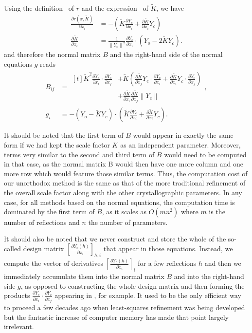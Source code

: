 \documentclass[pdf]{iucr}
\newcommand{\norm}[1]{\left\| #1 \right\|}
\DeclareMathOperator{\dotprod}{\cdot}
\newcommand{\partialder}[2]{\frac{\partial #1}{\partial #2}}
\begin{document}
Using the definition~ of $r$ and the expression~ of $\tilde{K}$, we have
\begin{align}
\partialder{r(x, \tilde{K})}{x_i} &= -\left( \tilde{K}\partialder{Y_c}{x_i} + \partialder{\tilde{K}}{x_i} Y_c \right) \\
\partialder{\tilde{K}}{x_i} &= \frac{1}{\norm{Y_c}^2}\partialder{Y_c}{x_i} \dotprod \left(Y_o - 2 \tilde{K}Y_c \right).
\end{align}
and therefore the normal matrix $B$ and the right-hand side of the normal equations $g$ reads
\begin{align}
B_{ij} &= \begin{aligned}[t] \tilde{K}^2\partialder{Y_c}{x_i} \dotprod \partialder{Y_c}{x_j} 
&+ \tilde{K} \left( \partialder{\tilde{K}}{x_j}Y_c \dotprod \partialder{Y_c}{x_i}
+ \partialder{\tilde{K}}{x_i}Y_c \dotprod \partialder{Y_c}{x_j} \right) \nonumber\\
&+ \partialder{\tilde{K}}{x_i}\partialder{\tilde{K}}{x_j} \norm{Y_c}
\end{aligned},
\label{eqn:normalmatrixwithoutscalefactor} \\
g_i &= - (Y_o - \tilde{K}Y_c) \dotprod \left( \tilde{K}\partialder{Y_c}{x_i} + \partialder{\tilde{K}}{x_i} Y_c \right).
\end{align}

It should be noted that the first term of $B$ would appear in exactly the same form if we had kept the scale factor $K$ as an independent parameter. Moreover, terms very similar to the second and third term of $B$ would need to be computed in that case, as the normal matrix B would then have one more column and one more row which would feature those similar terms. Thus, the computation cost of our unorthodox method is the same as that of the more traditional refinement of the overall scale factor along with the other crystallographic parameters. In any case, for all methods based on the normal equations, the computation time is dominated by the first term of $B$, as it scales as $O(mn^2)$ where $m$ is the number of reflections and $n$ the number of parameters.

It should also be noted that we never construct and store the whole of the so-called design matrix $\left[ \partialder{Y_c(h)}{x_i} \right]_{h,i}$ that appear in those equations. Instead, we compute the vector of derivatives $\left[ \partialder{Y_c(h)}{x_i} \right]_i$ for a few reflections $h$ and then we immediately accumulate them into the normal matrix $B$ and into the right-hand side $g$, as opposed to constructing the whole design matrix and then forming the products $\partialder{Y_c}{x_i} \dotprod \partialder{Y_c}{x_j}$ appearing in , for example. It used to be the only efficient way to proceed a few decades ago when least-squares refinement was being developed but the fantastic increase of computer memory has made that point largely irrelevant.
\end{document}
